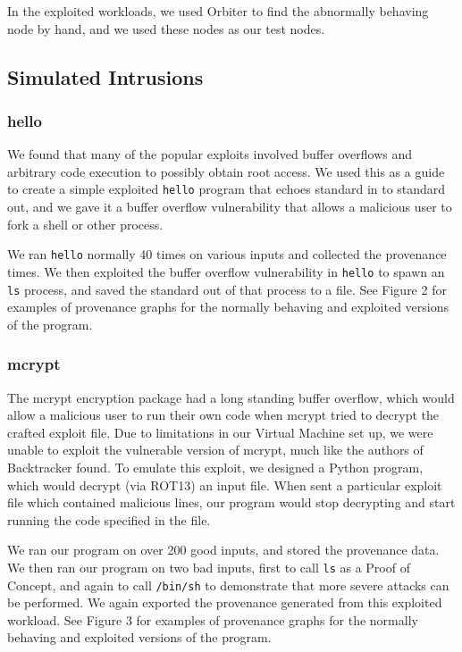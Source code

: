 \documentclass[10pt,twocolumn]{article}
\begin{document}
In the exploited workloads, we used Orbiter \cite{orbiter} to find the abnormally behaving node by hand, and we used these nodes as our test nodes.

\subsection{Simulated Intrusions}

\subsubsection{hello}
We found that many of the popular exploits \cite{metasploit, exploitdb} involved buffer overflows and arbitrary code execution to possibly obtain root access. We used this as a guide to create a simple exploited \texttt{hello} program that echoes standard in to standard out, and we gave it a buffer overflow vulnerability that allows a malicious user to fork a shell or other process.

We ran \texttt{hello} normally 40 times on various inputs and collected the provenance times. We then exploited the buffer overflow vulnerability in \texttt{hello} to spawn an \texttt{ls} process, and saved the standard out of that process to a file. See Figure 2 for examples of provenance graphs for the normally behaving and exploited versions of the program.

\subsubsection{mcrypt}
The mcrypt encryption package had a long standing buffer overflow, which would allow a malicious user to run their own code when mcrypt tried to decrypt the crafted exploit file. Due to limitations in our Virtual Machine set up, we were unable to exploit the vulnerable version of mcrypt, much like the authors of Backtracker \cite{backtracker} found. To emulate this exploit, we designed a Python program, which would decrypt (via ROT13) an input file. When sent a particular exploit file which contained malicious lines, our program would stop decrypting and start running the code specified in the file.

We ran our program on over 200 good inputs, and stored the provenance data. We then ran our program on two bad inputs, first to call \texttt{ls} as a Proof of Concept, and again to call \texttt{/bin/sh} to demonstrate that more severe attacks can be performed. We again exported the provenance generated from this exploited workload. See Figure 3 for examples of provenance graphs for the normally behaving and exploited versions of the program.
\end{document}
